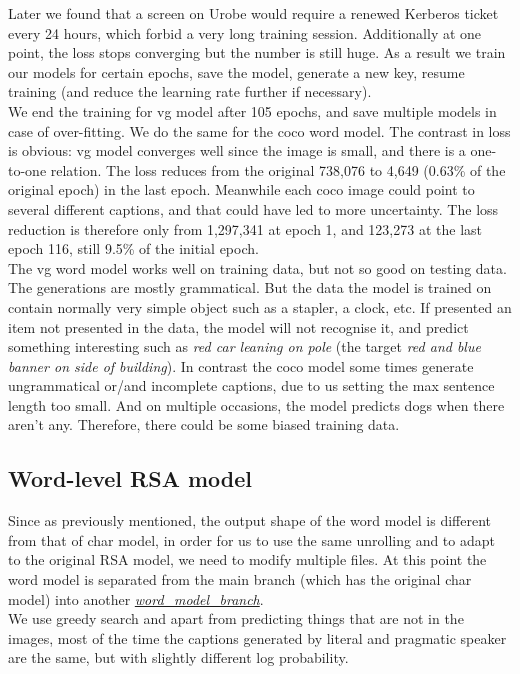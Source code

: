 \documentclass[a4paper]{scrartcl}
\begin{document}
Later we found that a screen on Urobe would require a renewed Kerberos ticket every 24 hours, which forbid a very long training session. Additionally at one point, the loss stops converging but the number is still huge. As a result we train our models for certain epochs, save the model, generate a new key, resume training (and reduce the learning rate further if necessary). \\

We end the training for vg model after 105 epochs, and save multiple models in case of over-fitting. We do the same for the coco word model. The contrast in loss is obvious: vg model converges well since the image is small, and there is a one-to-one relation. The loss reduces from the original 738,076 to 4,649 (0.63\% of the original epoch) in the last epoch. Meanwhile each coco image could point to several different captions, and that could have led to more uncertainty. The loss reduction is therefore only from 1,297,341 at epoch 1, and 123,273 at the last epoch 116, still 9.5\% of the initial epoch.\\

The vg word model works well on training data, but not so good on testing data. The generations are mostly grammatical. But the data the model is trained on contain normally very simple object such as a stapler, a clock, etc. If presented an item not presented in the data, the model will not recognise it, and predict something interesting such as \emph{red car leaning on pole} (the target \emph{red and blue banner on side of building}). In contrast the coco model some times generate ungrammatical or/and incomplete captions, due to us setting the max sentence length too small. And on multiple occasions, the model predicts dogs when there aren't any. Therefore, there could be some biased training data.  
\subsection*{Word-level RSA model}
Since as previously mentioned, the output shape of the word model is different from that of char model, in order for us to use the same unrolling and to adapt to the original RSA model, we need to modify multiple files. At this point the word model is separated from the main branch (which has the original char model) into another \href{https://github.com/Meng3www/PPlusPlus/tree/word_model_branch}{\emph{word\_model\_branch}}. \\

We use greedy search and apart from predicting things that are not in the images, most of the time the captions generated by literal and pragmatic speaker are the same, but with slightly different log probability. \\
\end{document}
